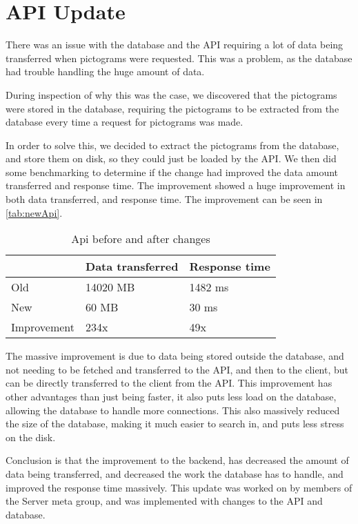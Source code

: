 \section{API Update}\label{CollabAPIUpdate}
There was an issue with the database and the API requiring a lot of data being transferred when pictograms were requested.
This was a problem, as the database had trouble handling the huge amount of data.

During inspection of why this was the case, we discovered that the pictograms were stored in the database, requiring the pictograms to be extracted from the database every time a request for pictograms was made.

In order to solve this, we decided to extract the pictograms from the database, and store them on disk, so they could just be loaded by the API.
We then did some benchmarking to determine if the change had improved the data amount transferred and response time.
The improvement showed a huge improvement in both data transferred, and response time.
The improvement can be seen in \autoref{tab:newApi}.

\begin{table}[H]
    \centering
    \begin{tabular}{|l|l|l|}
    \hline
                    & Data transferred  & Response time \\ \hline
        Old         & 14020 MB          & 1482 ms       \\ \hline
        New         & 60 MB             & 30 ms         \\ \hline
        Improvement & 234x              & 49x           \\ \hline
    \end{tabular}
    \caption{Api before and after changes}
    \label{tab:newApi}
\end{table}

The massive improvement is due to data being stored outside the database, and not needing to be fetched and transferred to the API, and then to the client, but can be directly transferred to the client from the API.
This improvement has other advantages than just being faster, it also puts less load on the database, allowing the database to handle more connections.
This also massively reduced the size of the database, making it much easier to search in, and puts less stress on the disk.

Conclusion is that the improvement to the backend, has decreased the amount of data being transferred, and decreased the work the database has to handle, and improved the response time massively.
This update was worked on by members of the Server meta group, and was implemented with changes to the API and database.
